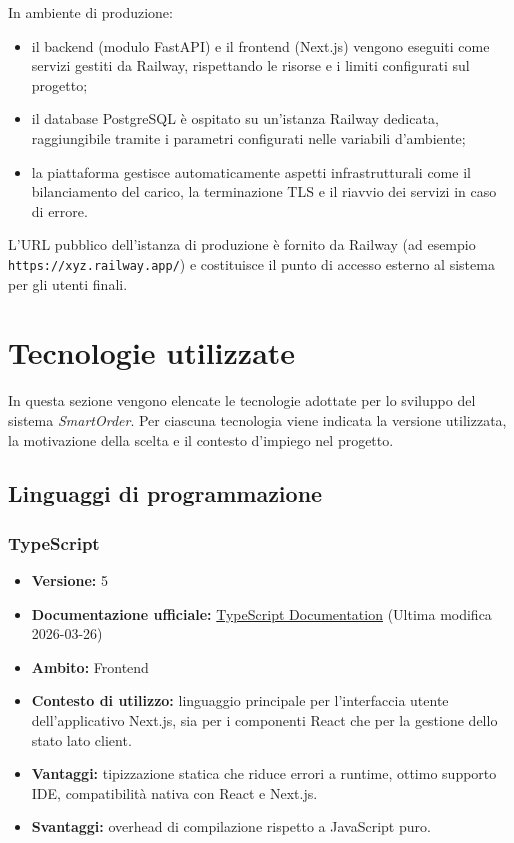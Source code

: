 \documentclass[a4paper, 11pt, oneside]{scrartcl}
\begin{document}
In ambiente di produzione:
\begin{itemize}
    \item il backend (modulo FastAPI) e il frontend (Next.js) vengono eseguiti come servizi gestiti da Railway, rispettando le risorse e i limiti configurati sul progetto;
    \item il database PostgreSQL \`e ospitato su un'istanza Railway dedicata, raggiungibile tramite i parametri configurati nelle variabili d'ambiente;
    \item la piattaforma gestisce automaticamente aspetti infrastrutturali come il bilanciamento del carico, la terminazione TLS e il riavvio dei servizi in caso di errore.
\end{itemize}

L'URL pubblico dell'istanza di produzione \`e fornito da Railway (ad esempio \texttt{https://xyz.railway.app/}) e costituisce il punto di accesso esterno al sistema per gli utenti finali.


\newpage

\section{Tecnologie utilizzate}

In questa sezione vengono elencate le tecnologie adottate per lo sviluppo del sistema \textit{SmartOrder}. Per ciascuna tecnologia viene indicata la versione utilizzata, la motivazione della scelta e il contesto d'impiego nel progetto.

\subsection{Linguaggi di programmazione}

\subsubsection{TypeScript}
\begin{itemize}[noitemsep]
\item \textbf{Versione:} 5
\item \textbf{Documentazione ufficiale:} \href{https://www.typescriptlang.org/docs/}{TypeScript
 Documentation} (Ultima modifica 2026-03-26)
\item \textbf{Ambito:} Frontend
\item \textbf{Contesto di utilizzo:} linguaggio principale per l'interfaccia utente dell'applicativo Next.js, sia per i componenti React che per la gestione dello stato lato client.
\item \textbf{Vantaggi:} tipizzazione statica che riduce errori a runtime, ottimo supporto IDE, compatibilit\`a nativa con React e Next.js.
\item \textbf{Svantaggi:} overhead di compilazione rispetto a JavaScript puro.
\end{itemize}
\end{document}
